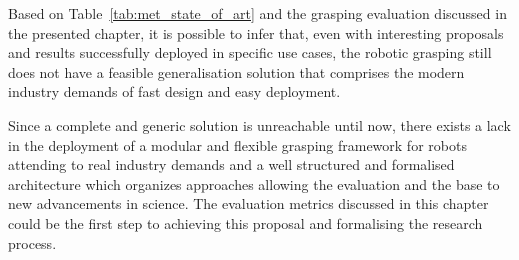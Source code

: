 
%

\clearpage
\thispagestyle{empty}

\clearpage

Based on Table~\ref{tab:met_state_of_art} and the grasping evaluation discussed in the presented chapter, it is possible to infer that, even with interesting proposals and results successfully deployed in specific use cases, the robotic grasping still does not have a feasible generalisation solution that comprises the modern industry demands of fast design and easy deployment.

Since a complete and generic solution is unreachable until now, there exists a lack in the deployment of a modular and flexible grasping framework for robots attending to real industry demands and a well structured and formalised architecture which organizes approaches allowing the evaluation and the base to new advancements in science. The evaluation metrics discussed in this chapter could be the first step to achieving this proposal and formalising the research process.